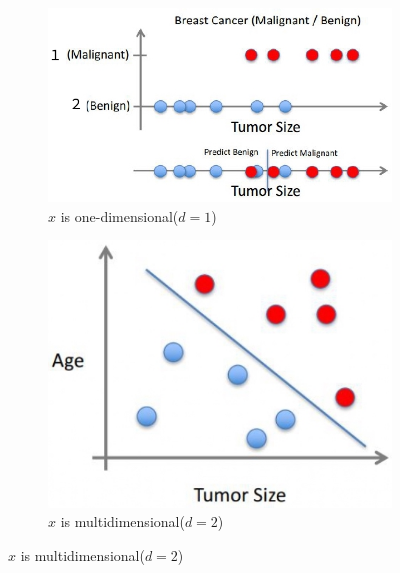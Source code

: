 \begin{itemize}
            \begin{figure}[h]
                  \centering
                  \begin{subfigure}{0.52\textwidth}
                        \centering
                        \includegraphics[width=\textwidth]{../img/Classification_1}
                        \caption{$x$ is one-dimensional($d=1$)}
                  \end{subfigure}
                  \hfill
                  \begin{subfigure}{0.38\textwidth}
                        \centering
                        \includegraphics[width=\textwidth]{../img/Classification_2}
                        \caption{$x$ is multidimensional($d=2$)}
                  \end{subfigure}
            \end{figure}


\end{itemize}
